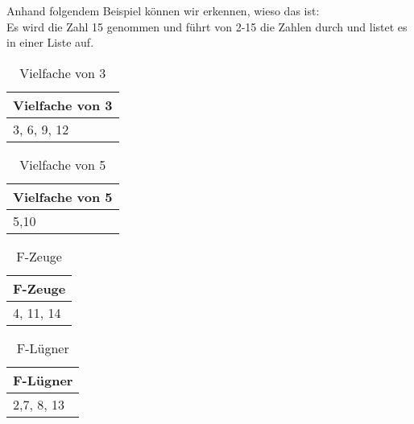 Anhand folgendem Beispiel können wir erkennen, wieso das ist:
\\
Es wird die Zahl 15 genommen und führt von 2-15 die Zahlen durch und listet es in einer Liste auf.\\
\newpage
\begin{table}[!ht]
    \centering
        \begin{tabular}{l}
            \toprule
            \textbf{Vielfache von 3}\\
            \midrule
            3, 6, 9, 12\\
           \bottomrule
        \end{tabular}
        \caption{Vielfache von 3}
        \label{tab3}
    \end{table}

    \begin{table}[!ht]
        \centering
            \begin{tabular}{l}
                \toprule
                \textbf{Vielfache von 5}\\
                \midrule
                5,10\\
               \bottomrule
            \end{tabular}
            \caption{Vielfache von 5}
            \label{tab3}
        \end{table}

        \begin{table}[!ht]
            \centering
                \begin{tabular}{l}
                    \toprule
                    \textbf{F-Zeuge}\\
                    \midrule
                    4, 11, 14\\
                   \bottomrule
                \end{tabular}
                \caption{F-Zeuge}
                \label{tab3}
            \end{table}

            \begin{table}[!ht]
                \centering
                    \begin{tabular}{l}
                        \toprule
                        \textbf{F-Lügner}\\
                        \midrule
                        2,7, 8, 13 \\
                       \bottomrule
                    \end{tabular}
                    \caption{F-Lügner}
                    \label{tab3}
                \end{table}

